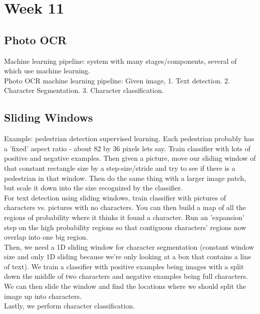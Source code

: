 \documentclass[11pt,letterpaper]{article}
\begin{document}
\section{Week 11}
\subsection{Photo OCR}
Machine learning pipeline: system with many stages/components, several of which use machine learning.\\
Photo OCR machine learning pipeline: Given image, 1. Text detection. 2. Character Segmentation. 3. Character classification.
\subsection{Sliding Windows}
Example: pedestrian detection supervised learning. Each pedestrian probably has a 'fixed' aspect ratio - about 82 by 36 pixels lets say. Train classifier with lots of positive and negative examples. Then given a picture, move our sliding window of that constant rectangle size by a step-size/stride and try to see if there is a pedestrian in that window. Then do the same thing with a larger image patch, but scale it down into the size recognized by the classifier.\\
For text detection using sliding windows, train classifier with pictures of characters vs. pictures with no characters. You can then build a map of all the regions of probability where it thinks it found a character. Run an 'expansion' step on the high probability regions so that contiguous characters' regions now overlap into one big region.\\
Then, we need a 1D sliding window for character segmentation (constant window size and only 1D sliding because we're only looking at a box that contains a line of text). We train a classifier with positive examples being images with a split down the middle of two characters and negative examples being full characters. We can then slide the window and find the locations where we should split the image up into characters.\\
Lastly, we perform character classification.
\end{document}
